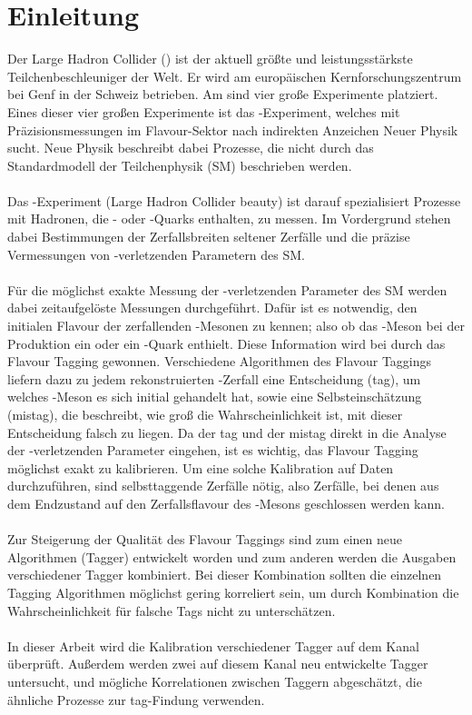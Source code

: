 \chapter{Einleitung}

Der Large Hadron Collider (\lhc) ist der aktuell größte und leistungsstärkste Teilchenbeschleuniger der Welt. Er wird am europäischen Kernforschungszentrum \cern bei Genf in der Schweiz betrieben. Am \lhc sind vier große Experimente platziert. Eines dieser vier großen Experimente ist das \lhcb-Experiment, welches mit Präzisionsmessungen im Flavour-Sektor nach indirekten Anzeichen Neuer Physik sucht. Neue Physik beschreibt dabei Prozesse, die nicht durch das Standardmodell der Teilchenphysik (SM) beschrieben werden.\\
\\
Das \lhcb-Experiment (Large Hadron Collider beauty) ist darauf spezialisiert Prozesse mit Hadronen, die \bquark- oder \cquark-Quarks enthalten, zu messen. Im Vordergrund stehen dabei Bestimmungen der Zerfallsbreiten seltener Zerfälle und die präzise Vermessungen von \CP-verletzenden Parametern des SM.\\
\\
Für die möglichst exakte Messung der \CP-verletzenden Parameter des SM werden dabei zeitaufgelöste Messungen durchgeführt. Dafür ist es notwendig, den initialen Flavour der zerfallenden \B-Mesonen zu kennen; also ob das \B-Meson bei der Produktion ein \bquark oder ein \bquarkbar-Quark enthielt. Diese Information wird bei \lhcb durch das Flavour Tagging gewonnen. Verschiedene Algorithmen des Flavour Taggings liefern dazu zu jedem rekonstruierten \B-Zerfall eine Entscheidung (tag), um welches \B-Meson es sich initial gehandelt hat, sowie eine Selbsteinschätzung (mistag), die beschreibt, wie groß die Wahrscheinlichkeit ist, mit dieser Entscheidung falsch zu liegen. Da der tag und der mistag direkt in die Analyse der \CP-verletzenden Parameter eingehen, ist es wichtig, das Flavour Tagging möglichst exakt zu kalibrieren. Um eine solche Kalibration auf Daten durchzuführen, sind selbsttaggende Zerfälle nötig, also Zerfälle, bei denen aus dem Endzustand auf den Zerfallsflavour des \B-Mesons geschlossen werden kann.\\
\\
Zur Steigerung der Qualität des Flavour Taggings sind zum einen neue Algorithmen (Tagger) entwickelt worden \cite{charm-tagger} und zum anderen werden die Ausgaben verschiedener Tagger kombiniert. Bei dieser Kombination sollten die einzelnen Tagging Algorithmen möglichst gering korreliert sein, um durch Kombination die Wahrscheinlichkeit für falsche Tags nicht zu unterschätzen.\\
\\
In dieser Arbeit wird die Kalibration verschiedener Tagger auf dem Kanal \mbox{\BdToDpi} überprüft. Außerdem werden zwei auf diesem Kanal neu entwickelte Tagger untersucht, und mögliche Korrelationen zwischen Taggern abgeschätzt, die ähnliche Prozesse zur tag-Findung verwenden. 
